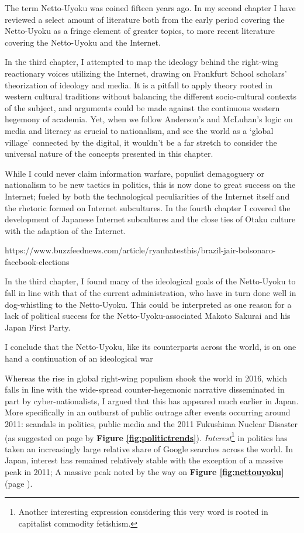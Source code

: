 \documentclass[10pt,british,A4paper,,openany]{memoir}
\begin{document}
The term Netto-Uyoku was coined fifteen years ago. In my second chapter
I have reviewed a select amount of literature both from the early period
covering the Netto-Uyoku as a fringe element of greater topics, to more
recent literature covering the Netto-Uyoku and the Internet.

In the third chapter, I attempted to map the ideology behind the
right-wing reactionary voices utilizing the Internet, drawing on
Frankfurt School scholars' theorization of ideology and media. It is a
pitfall to apply theory rooted in western cultural traditions without
balancing the different socio-cultural contexts of the subject, and
arguments could be made against the continuous western hegemony of
academia. Yet, when we follow Anderson's and McLuhan's logic on media
and literacy as crucial to nationalism, and see the world as a `global
village' connected by the digital, it wouldn't be a far stretch to
consider the universal nature of the concepts presented in this chapter.

While I could never claim information warfare, populist demagoguery or
nationalism to be new tactics in politics, this is now done to great
success on the Internet; fueled by both the technological peculiarities
of the Internet itself and the rhetoric formed on Internet subcultures.
In the fourth chapter I covered the development of Japanese Internet
subcultures and the close ties of Otaku culture with the adaption of the
Internet.

https://www.buzzfeednews.com/article/ryanhatesthis/brazil-jair-bolsonaro-facebook-elections

In the third chapter, I found many of the ideological goals of the
Netto-Uyoku to fall in line with that of the current administration, who
have in turn done well in dog-whistling to the Netto-Uyoku. This could
be interpreted as one reason for a lack of political success for the
Netto-Uyoku-associated Makoto Sakurai and his Japan First Party.

I conclude that the Netto-Uyoku, like its counterparts across the world,
is on one hand a continuation of an ideological war

Whereas the rise in global right-wing populism shook the world in 2016,
which falls in line with the wide-spread counter-hegemonic narrative
disseminated in part by cyber-nationalists, I argued that this has
appeared much earlier in Japan. More specifically in an outburst of
public outrage after events occurring around 2011: scandals in politics,
public media and the 2011 Fukushima Nuclear Disaster (as suggested on
page \pageref{populism-gt} by \textbf{Figure \ref{fig:politictrends}}).
\emph{Interest}\footnote{Another interesting expression considering this
  very word is rooted in capitalist commodity fetishism.} in politics
has taken an increasingly large relative share of Google searches across
the world. In Japan, interest has remained relatively stable with the
exception of a massive peak in 2011; A massive peak noted by the way on
\textbf{Figure \ref{fig:nettouyoku}} (page \pageref{nettouyoku-gt}).
\end{document}
